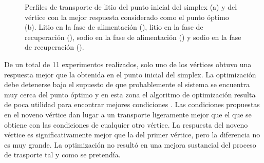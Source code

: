 \begin{figure}[H]
    \centering
    \caption[Perfiles de transporte de litio del sistema bajo optimización.]{Perfiles de transporte de litio del punto inicial del simplex (a) y del vértice con la mejor respuesta considerado como el punto óptimo (b). Litio en la fase de alimentación (\protect\squareblck), litio en la fase de recuperación (\protect\squarewht), sodio en la fase de alimentación (\protect\triangleupblck) y sodio en la fase de recuperación (\protect\triangleupwht).}
    \label{fig:simplex2.profiles}
\end{figure}
De un total de 11 experimentos realizados, solo uno de los vértices obtuvo una respuesta mejor que la obtenida en el punto inicial del simplex. La optimización debe detenerse bajo el supuesto de que probablemente el sistema se encuentra muy cerca del punto óptimo y en esta zona el algoritmo de optimización resulta de poca utilidad para encontrar mejores condiciones \citep{simplexbook}. Las condiciones propuestas en el noveno vértice dan lugar a un transporte ligeramente mejor que el que se obtiene con las condiciones de cualquier otro vértice. La respuesta del noveno vértice es significativamente mejor que la del primer vértice, pero la diferencia no es muy grande. La optimización no resultó en una mejora sustancial del proceso de trasporte tal y como se pretendía.

